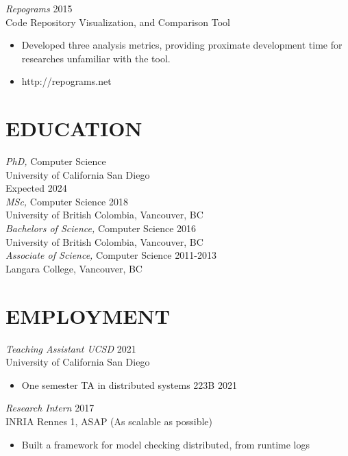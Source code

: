 \documentclass[line,margin]{res}
\begin{document}
\begin{resume}
{{\sl Repograms} \hfill 2015\\
	Code Repository Visualization, and Comparison Tool
\begin{itemize} \itemsep -2pt
        \item Developed three analysis metrics, providing proximate development time for researches unfamiliar with the tool.
		\item http://repograms.net
\end{itemize}


\section{EDUCATION}
{\sl PhD,} Computer Science \\
University of California San Diego \\
Expected 2024 \\

{\sl MSc,} Computer Science \hfill 2018 \\
University of British Colombia, Vancouver, BC \\

{\sl Bachelors of Science,} Computer Science	\hfill 2016\\
University of British Colombia, Vancouver, BC \\

{\sl Associate of Science,} Computer Science \hfill 2011-2013\\
Langara College, Vancouver, BC\\


\section{EMPLOYMENT} 

{\sl Teaching Assistant UCSD} \hfill 2021\\
	University of California San Diego
\begin{itemize} \itemsep -2pt
        \item One semester TA in distributed systems 223B \hfill 2021
	\end{itemize}

{\sl Research Intern} \hfill 2017\\
    INRIA Rennes 1, ASAP (As scalable as possible)
\begin{itemize} \itemsep -2pt
        \item Built a framework for model checking distributed, from runtime logs
    \end{itemize}

}
\end{resume}
\end{document}
